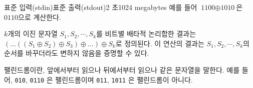 \begin{problem}{\probtitle}{표준 입력(stdin)}{표준 출력(stdout)}{2 초}{1024 megabytes}
예를 들어 $\text{1100} \oplus \text{1010}$은 $\text{0110}$으로 계산한다.

$k$개의 이진 문자열 $S_1, S_2, \cdots, S_k$를 비트별 배타적 논리합한 결과는 $(\dots((S_1 \oplus S_2) \oplus S_3) \oplus \dots) \oplus S_k$로 정의된다. 이 연산의 결과는 $S_1, S_2, \cdots, S_k$의 순서를 바꾸더라도 변하지 않음을 증명할 수 있다.

팰린드롬이란, 앞에서부터 읽으나 뒤에서부터 읽으나 같은 문자열을 말한다. 예를 들어, \texttt{010}, \texttt{0110} 은 팰린드롬이며 \texttt{011}, \texttt{1011} 은 팰린드롬이 아니다.

\end{problem}